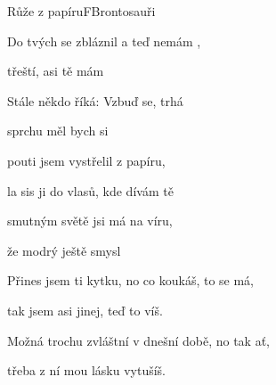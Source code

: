 \begin{song}{Růže z papíru}{F}{Brontosauři}

\begin{SBVerse}

Do tvých  se zbláznil a teď  nemám ,

 třeští, asi tě mám 

Stále někdo říká: Vzbuď se, trhá 

 sprchu měl bych si 

\end{SBVerse}

\begin{SBChorus}

 pouti jsem vystřelil  z papíru,

la sis ji do vlasů, kde dívám tě 

 smutným světě jsi má  na víru,

že  modrý ještě smysl 

\end{SBChorus}

\begin{SBVerse}

Přines jsem ti kytku, no co koukáš, to se má,

tak jsem asi jinej, teď to víš.

Možná trochu zvláštní v dnešní době, no tak ať,

třeba z ní mou lásku vytušíš.

\end{SBVerse}

\begin{SBChorus}

\end{SBChorus}

\end{song}

\clearpage
